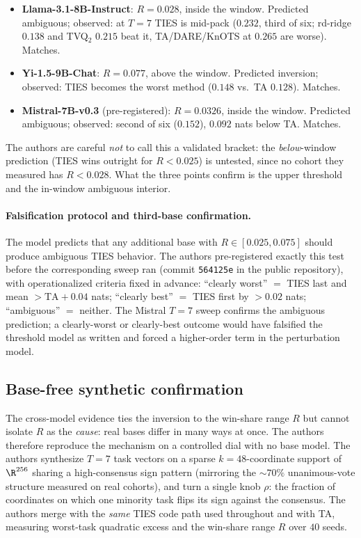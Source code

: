 \begin{itemize}[leftmargin=*,topsep=2pt,itemsep=2pt]
\item \textbf{Llama-3.1-8B-Instruct}: $R = 0.028$, inside the window.
Predicted ambiguous; observed: at $T = 7$ TIES is mid-pack ($0.232$,
third of six; rd-ridge $0.138$ and TVQ$_2$ $0.215$ beat it,
TA/DARE/KnOTS at $0.265$ are worse). Matches.
\item \textbf{Yi-1.5-9B-Chat}: $R = 0.077$, above the window.
Predicted inversion; observed: TIES becomes the worst method
($0.148$ vs.\ TA $0.128$). Matches.
\item \textbf{Mistral-7B-v0.3} (pre-registered): $R = 0.0326$, inside
the window. Predicted ambiguous; observed: second of six ($0.152$),
$0.092$ nats below TA. Matches.
\end{itemize}
The authors are careful \emph{not} to call this a validated bracket: the
\emph{below}-window prediction (TIES wins outright for $R < 0.025$) is
untested, since no cohort they measured has $R < 0.028$. What the three
points confirm is the upper threshold and the in-window ambiguous
interior.

\paragraph{Falsification protocol and third-base confirmation.} The
model predicts that any additional base with $R \in [0.025, 0.075]$
should produce ambiguous TIES behavior. The authors pre-registered exactly this
test before the corresponding sweep ran (commit \texttt{564125e} in
the public repository), with operationalized criteria
fixed in advance: ``clearly worst'' $=$ TIES last and mean
$> \mathrm{TA} + 0.04$ nats; ``clearly best'' $=$ TIES first by
$> 0.02$ nats; ``ambiguous'' $=$ neither. The Mistral $T = 7$ sweep
confirms the ambiguous prediction; a clearly-worst or clearly-best
outcome would have falsified the threshold model as written and forced
a higher-order term in the perturbation model.

\subsection{Base-free synthetic confirmation}
\label{app:td2-synthetic}

The cross-model evidence ties the inversion to the win-share range $R$
but cannot isolate $R$ as the \emph{cause}: real bases differ in many
ways at once. The authors therefore reproduce the mechanism on a controlled
dial with no base model. The authors synthesize $T = 7$ task vectors on a
sparse $k = 48$-coordinate support of $\R^{256}$ sharing a
high-consensus sign pattern (mirroring the $\sim 70\%$ unanimous-vote
structure measured on real cohorts), and turn a single knob $\rho$:
the fraction of coordinates on which one minority task flips its sign
against the consensus. The authors merge with the \emph{same} TIES code path
used throughout and with TA, measuring worst-task quadratic excess and
the win-share range $R$ over $40$ seeds.

